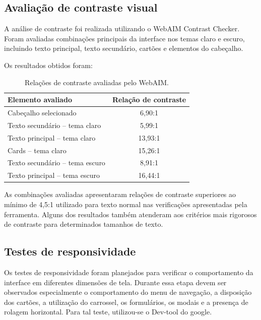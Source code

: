 \vspace{5mm}
\subsection{Avaliação de contraste visual}

A análise de contraste foi realizada utilizando o WebAIM Contrast Checker. Foram avaliadas combinações principais da interface nos temas claro e escuro, incluindo texto principal, texto secundário, cartões e elementos do cabeçalho.

Os resultados obtidos foram:

\begin{table}[H]
	\centering
	\caption{Relações de contraste avaliadas pelo WebAIM.}
	\label{tab:webaim}
	\renewcommand{\arraystretch}{1.4}
	\setlength{\tabcolsep}{16pt}
	\begin{tabular}{lc}
		\hline
		\textbf{Elemento avaliado} & \textbf{Relação de contraste} \\
		\hline
		Cabeçalho selecionado & 6,90:1 \\
		Texto secundário -- tema claro & 5,99:1 \\
		Texto principal -- tema claro & 13,93:1 \\
		Cards -- tema claro & 15,26:1 \\
		Texto secundário -- tema escuro & 8,91:1 \\
		Texto principal -- tema escuro & 16,44:1 \\
		\hline
	\end{tabular}
\end{table}


As combinações avaliadas apresentaram relações de contraste superiores ao mínimo de 4,5:1 utilizado para texto normal nas verificações apresentadas pela ferramenta. Alguns dos resultados também atenderam aos critérios mais rigorosos de contraste para determinados tamanhos de texto.

\vspace{5mm}
\subsection{Testes de responsividade}

Os testes de responsividade foram planejados para verificar o comportamento da interface em diferentes dimensões de tela. Durante essa etapa devem ser observados especialmente o comportamento do menu de navegação, a disposição dos cartões, a utilização do carrossel, os formulários, os modais e a presença de rolagem horizontal. Para tal teste, utilizou-se o Dev-tool do google.

